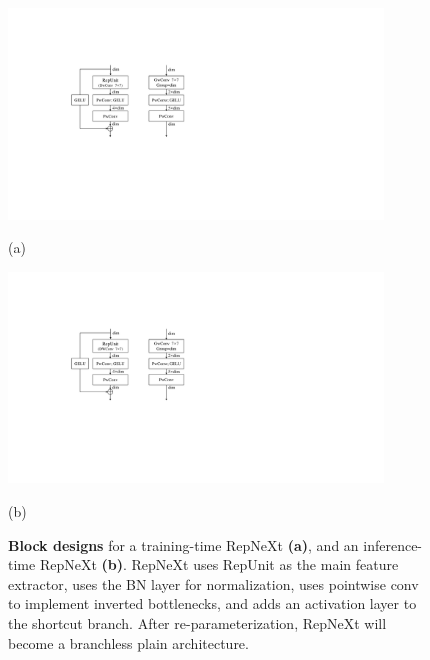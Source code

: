 \documentclass[preprint,12pt]{elsarticle}
\begin{document}
\begin{figure}
  \centering
  \begin{minipage}{0.49\linewidth}
    \centering
    \includegraphics[height=5.6cm]{figs/fig3-a.pdf}
    \par
    (a)
    \label{fig:repnext-train}
  \end{minipage}
  \hfill
  \begin{minipage}{0.49\linewidth}
    \centering
    \includegraphics[height=5.6cm]{figs/fig3-b.pdf}
    \par
    (b)
    \label{fig:repnext-infer}
  \end{minipage}
  \caption{\textbf{Block designs} for a training-time RepNeXt \textbf{(a)}, and an inference-time RepNeXt \textbf{(b)}. RepNeXt uses RepUnit as the main feature extractor, uses the BN layer for normalization, uses pointwise conv to implement inverted bottlenecks, and adds an activation layer to the shortcut branch. After re-parameterization, RepNeXt will become a branchless plain architecture.}
  \label{fig:blocks}
\end{figure}
\end{document}
